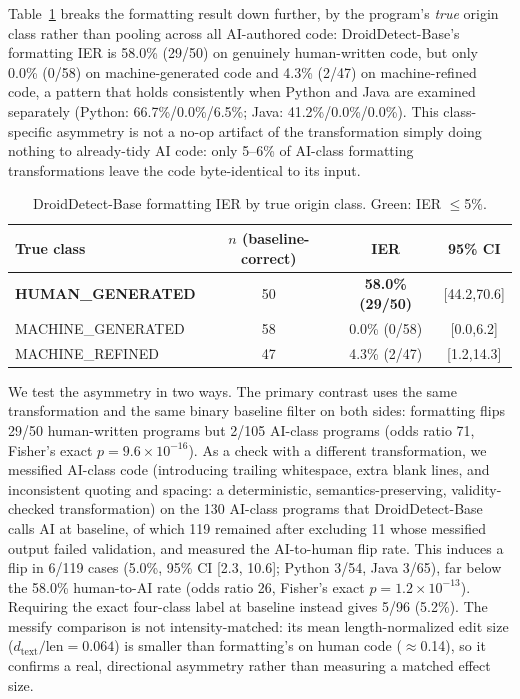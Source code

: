 \documentclass[sigconf,review,anonymous]{acmart}
\begin{document}
Table~\ref{tab:byclass} breaks the formatting result down further, by the program's \emph{true} origin class rather than pooling across all AI-authored code: DroidDetect-Base's formatting IER is 58.0\% (29/50) on genuinely human-written code, but only 0.0\% (0/58) on machine-generated code and 4.3\% (2/47) on machine-refined code, a pattern that holds consistently when Python and Java are examined separately (Python: 66.7\%/0.0\%/6.5\%; Java: 41.2\%/0.0\%/0.0\%). This class-specific asymmetry is not a no-op artifact of the transformation simply doing nothing to already-tidy AI code: only 5--6\% of AI-class formatting transformations leave the code byte-identical to its input.

\begin{table}[t]
\centering
\footnotesize
\setlength{\tabcolsep}{3pt}
\caption{DroidDetect-Base formatting IER by true origin class. Green: IER $\le$5\%.}
\label{tab:byclass}
\begin{tabular}{@{}lccc@{}}
\toprule
True class & $n$ (baseline-correct) & IER & 95\% CI \\
\midrule
\textbf{HUMAN\_GENERATED} & 50 & \textbf{58.0\% (29/50)} & [44.2,70.6] \\
MACHINE\_GENERATED & 58 & \cellcolor{green!20}0.0\% (0/58) & [0.0,6.2] \\
MACHINE\_REFINED & 47 & \cellcolor{green!20}4.3\% (2/47) & [1.2,14.3] \\
\bottomrule
\end{tabular}
\end{table}

We test the asymmetry in two ways. The primary contrast uses the same transformation and the same binary baseline filter on both sides: formatting flips 29/50 human-written programs but 2/105 AI-class programs (odds ratio 71, Fisher's exact $p{=}9.6{\times}10^{-16}$). As a check with a different transformation, we messified AI-class code (introducing trailing whitespace, extra blank lines, and inconsistent quoting and spacing: a deterministic, semantics-preserving, validity-checked transformation) on the 130 AI-class programs that DroidDetect-Base calls AI at baseline, of which 119 remained after excluding 11 whose messified output failed validation, and measured the AI-to-human flip rate. This induces a flip in 6/119 cases (5.0\%, 95\% CI [2.3, 10.6]; Python 3/54, Java 3/65), far below the 58.0\% human-to-AI rate (odds ratio 26, Fisher's exact $p{=}1.2{\times}10^{-13}$). Requiring the exact four-class label at baseline instead gives 5/96 (5.2\%). The messify comparison is not intensity-matched: its mean length-normalized edit size ($d_\text{text}/\text{len} = 0.064$) is smaller than formatting's on human code ($\approx$0.14), so it confirms a real, directional asymmetry rather than measuring a matched effect size.
\end{document}
